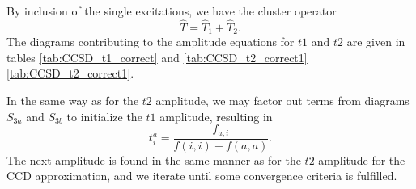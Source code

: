 By inclusion of the single excitations, we have the cluster operator
\begin{equation}
\hat{T} = \hat{T}_1 + \hat{T}_2.
\end{equation}
The diagrams contributing to the amplitude equations for $t1$
and $t2$ are given in tables \ref{tab:CCSD_t1_correct} and
\ref{tab:CCSD_t2_correct1} \ref{tab:CCSD_t2_correct1}.

In the same way as for the $t2$ amplitude, we may factor out terms from
diagrams $S_{3a}$ and $S_{3b}$ to initialize the $t1$ amplitude, resulting in
\begin{equation}
t_i^a = \frac{f_{a,i}}{f(i,i) - f(a,a)}  .
\end{equation}
The next amplitude is found in the same manner as for the $t2$ amplitude
for the CCD approximation, and we iterate until some convergence
criteria is fulfilled.





